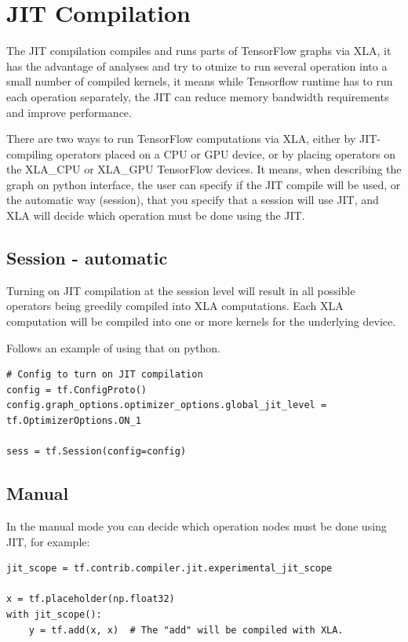 \documentclass[11pt,openany]{book}
\begin{document}
\section{JIT Compilation}

The JIT compilation compiles and runs parts of TensorFlow graphs via XLA, it has the advantage of analyses and try to otmize to run several operation into a small number of compiled kernels, it means while Tensorflow runtime has to run each operation separately, the JIT can reduce memory bandwidth requirements and improve performance.

There are two ways to run TensorFlow computations via XLA, either by JIT-compiling operators placed on a CPU or GPU device, or by placing operators on the XLA\_CPU or XLA\_GPU TensorFlow devices. It means, when describing the graph on python interface, the user can specify if the JIT compile will be used, or the automatic way (session), that you specify that a session will use JIT, and XLA will decide which operation must be done using the JIT.

\subsection{Session - automatic}
Turning on JIT compilation at the session level will result in all possible operators being greedily compiled into XLA computations. Each XLA computation will be compiled into one or more kernels for the underlying device.

Follows an example of using that on python.

\begin{verbatim}
# Config to turn on JIT compilation
config = tf.ConfigProto()
config.graph_options.optimizer_options.global_jit_level = tf.OptimizerOptions.ON_1

sess = tf.Session(config=config)
\end{verbatim}

\subsection{Manual}

In the manual mode you can decide which operation nodes must be done using JIT, for example:

\begin{verbatim}
jit_scope = tf.contrib.compiler.jit.experimental_jit_scope

x = tf.placeholder(np.float32)
with jit_scope():
    y = tf.add(x, x)  # The "add" will be compiled with XLA.
\end{verbatim}
\end{document}
